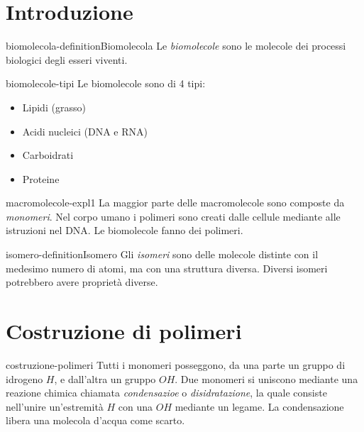 \documentclass[preview]{standalone}
\begin{document}
\genpage

\section{Introduzione}

\begin{snippetdefinition}{biomolecola-definition}{Biomolecola}
    Le \textit{biomolecole} sono le molecole dei processi biologici degli esseri viventi.
\end{snippetdefinition}


\begin{snippet}{biomolecole-tipi}
    Le biomolecole sono di 4 tipi:
    \begin{itemize}
        \item Lipidi (grasso)
        \item Acidi nucleici (DNA e RNA)
        \item Carboidrati
        \item Proteine
    \end{itemize}
\end{snippet}

\begin{snippet}{macromolecole-expl1}
    La maggior parte delle macromolecole sono composte da \textit{monomeri}. 
    Nel corpo umano i polimeri sono creati dalle cellule mediante alle istruzioni nel DNA.
    Le biomolecole fanno dei polimeri.
\end{snippet}

\begin{snippetdefinition}{isomero-definition}{Isomero}
    Gli \textit{isomeri} sono delle molecole distinte con il medesimo numero di atomi,
    ma con una struttura diversa. Diversi isomeri potrebbero avere proprietà diverse.
\end{snippetdefinition}

\section{Costruzione di polimeri}

\begin{snippet}{costruzione-polimeri}
    Tutti i monomeri posseggono, da una parte un gruppo di idrogeno \(H\),
e dall'altra un gruppo \(OH\).
Due monomeri si uniscono mediante una reazione chimica chiamata \textit{condensazioe} o \textit{disidratazione}, la quale consiste
nell'unire un'estremità \(H\) con una \(OH\) mediante un legame.
La condensazione libera una molecola d'acqua come scarto.
\end{snippet}
\end{document}
